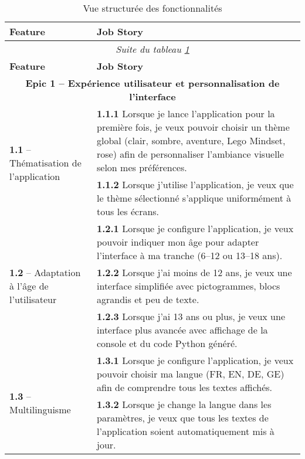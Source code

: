 \begin{longtable}{|p{}|p{}|}
\caption{\label{tab:features_overview} Vue structurée des fonctionnalités} \\
\hline
\textbf{Feature} & \textbf{Job Story} \\
\hline
\endfirsthead

\multicolumn{2}{c}{\textit{Suite du tableau \ref{tab:features_overview}}} \\
\hline
\textbf{Feature} & \textbf{Job Story} \\
\hline
\endhead

\hline
\multicolumn{2}{|c|}{\textbf{Epic 1 – Expérience utilisateur et personnalisation de l’interface}} \\
\hline
\multirow{2}{=}{\textbf{1.1 } – Thématisation de l’application} & \textbf{1.1.1}  Lorsque je lance l’application pour la première fois, je veux pouvoir choisir un thème global (clair, sombre, aventure, Lego Mindset, rose) afin de personnaliser l’ambiance visuelle selon mes préférences. \\
 & \textbf{1.1.2}  Lorsque j’utilise l’application, je veux que le thème sélectionné s’applique uniformément à tous les écrans. \\
\hline
\multirow{3}{=}{\textbf{1.2 } – Adaptation à l’âge de l’utilisateur} & \textbf{1.2.1}  Lorsque je configure l’application, je veux pouvoir indiquer mon âge pour adapter l’interface à ma tranche (6–12 ou 13–18 ans). \\
 & \textbf{1.2.2}  Lorsque j’ai moins de 12 ans, je veux une interface simplifiée avec pictogrammes, blocs agrandis et peu de texte. \\
 & \textbf{1.2.3}  Lorsque j’ai 13 ans ou plus, je veux une interface plus avancée avec affichage de la console et du code Python généré. \\
\hline
\multirow{2}{=}{\textbf{1.3 } – Multilinguisme} & \textbf{1.3.1}  Lorsque je configure l’application, je veux pouvoir choisir ma langue (FR, EN, DE, GE) afin de comprendre tous les textes affichés. \\
 & \textbf{1.3.2}  Lorsque je change la langue dans les paramètres, je veux que tous les textes de l’application soient automatiquement mis à jour. \\
\hline


\end{longtable}
